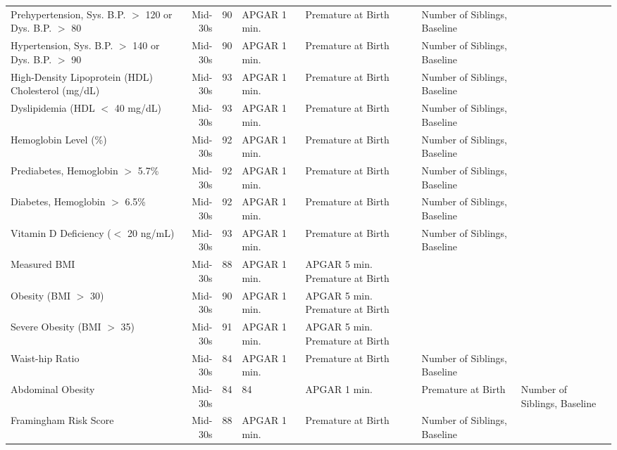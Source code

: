 \begin{tabular}{l r r l l l}
Prehypertension, Sys. B.P. $>$ 120 or Dys. B.P. $>$ 80	&	Mid-30s	&	90	&	APGAR 1 min. & Premature at Birth & Number of Siblings, Baseline	\\
Hypertension, Sys. B.P. $>$ 140 or Dys. B.P. $>$ 90	&	Mid-30s	&	90	&	APGAR 1 min. & Premature at Birth & Number of Siblings, Baseline	\\
High-Density Lipoprotein (HDL) Cholesterol (mg/dL)	&	Mid-30s	&	93	&	APGAR 1 min. & Premature at Birth & Number of Siblings, Baseline	\\
Dyslipidemia (HDL $<$ 40 mg/dL)	&	Mid-30s	&	93	&	APGAR 1 min. & Premature at Birth & Number of Siblings, Baseline	\\
Hemoglobin Level (\%)	&	Mid-30s	&	92	&	APGAR 1 min. & Premature at Birth & Number of Siblings, Baseline	\\
Prediabetes, Hemoglobin $>$ 5.7\%	&	Mid-30s	&	92	&	APGAR 1 min. & Premature at Birth & Number of Siblings, Baseline	\\
Diabetes, Hemoglobin $>$ 6.5\%	&	Mid-30s	&	92	&	APGAR 1 min. & Premature at Birth & Number of Siblings, Baseline	\\
Vitamin D Deficiency ($<$ 20 ng/mL)	&	Mid-30s	&	93	&	APGAR 1 min. & Premature at Birth & Number of Siblings, Baseline	\\

Measured BMI	&	Mid-30s	&	88	&	APGAR 1 min. & APGAR 5 min. Premature at Birth \\
Obesity (BMI $>$ 30)	&	Mid-30s	&	90	&	APGAR 1 min. & APGAR 5 min. Premature at Birth \\
Severe Obesity (BMI $>$ 35)	&	Mid-30s	&	91	&	APGAR 1 min. & APGAR 5 min. Premature at Birth \\
Waist-hip Ratio	&	Mid-30s	&	84	& APGAR 1 min. & Premature at Birth & Number of Siblings, Baseline \\
Abdominal Obesity	&	Mid-30s	&	84	&	84	& APGAR 1 min. & Premature at Birth & Number of Siblings, Baseline \\
Framingham Risk Score	&	Mid-30s	&	88	& APGAR 1 min. & Premature at Birth & Number of Siblings, Baseline \\
\bottomrule											
\end{tabular}